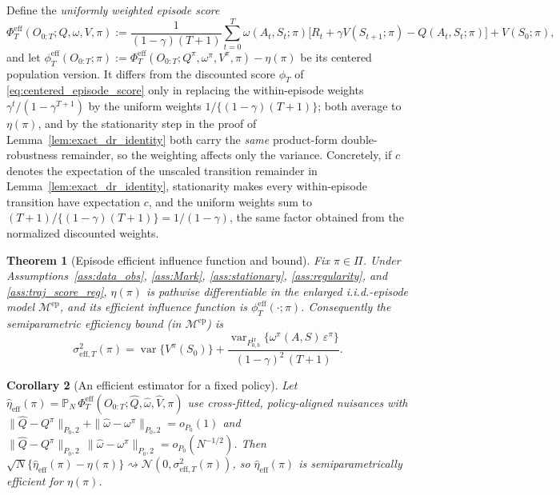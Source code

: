 \documentclass[12pt]{article}
\newtheorem{theorem}{Theorem}[section]
\newtheorem{corollary}[theorem]{Corollary}
\theoremstyle{remark}\newtheorem{remark}[theorem]{Remark}\theoremstyle{plain}
\newcommand{\pn}{\mathbb{P}_N}
\newcommand{\var}{\operatorname{var}}
\begin{document}
Define the \emph{uniformly weighted episode score}
\begin{equation}\label{eq:eff_score}
    \Phi^{\mathrm{eff}}_T(O_{0:T};Q,\omega,V,\pi)
    := \frac{1}{(1-\gamma)(T+1)}\sum_{t=0}^{T}
       \omega(A_t,S_t;\pi)\big[R_t+\gamma V(S_{t+1};\pi)
       -Q(A_t,S_t;\pi)\big]+V(S_0;\pi),
\end{equation}
and let
$\phi^{\mathrm{eff}}_T(O_{0:T};\pi)
:=\Phi^{\mathrm{eff}}_T(O_{0:T};Q^\pi,\omega^\pi,V^\pi,\pi)-\eta(\pi)$
be its centered population version.  It differs from the discounted
score $\phi_T$ of \eqref{eq:centered_episode_score} only in replacing
the within-episode weights $\gamma^t/(1-\gamma^{T+1})$ by the uniform
weights $1/\{(1-\gamma)(T+1)\}$; both average to $\eta(\pi)$, and by the
stationarity step in the proof of Lemma~\ref{lem:exact_dr_identity}
both carry the \emph{same} product-form double-robustness remainder, so
the weighting affects only the variance.  Concretely, if $c$ denotes
the expectation of the unscaled transition remainder in
Lemma~\ref{lem:exact_dr_identity}, stationarity makes every
within-episode transition have expectation $c$, and the uniform weights
sum to $(T+1)/\{(1-\gamma)(T+1)\}=1/(1-\gamma)$, the same factor
obtained from the normalized discounted weights.

\begin{theorem}[Episode efficient influence function and bound]
\label{thm:traj_eif}
    Fix $\pi\in\Pi$.  Under Assumptions~\ref{ass:data_obs},
    \ref{ass:Mark}, \ref{ass:stationary}, \ref{ass:regularity}, and
    \ref{ass:traj_score_reg}, $\eta(\pi)$ is pathwise differentiable in
    the enlarged i.i.d.-episode model $\mathcal M^{\mathrm{ep}}$, and its
    efficient influence function is $\phi^{\mathrm{eff}}_T(\cdot;\pi)$.
    Consequently the semiparametric efficiency bound (in
    $\mathcal M^{\mathrm{ep}}$) is
    \[
        \sigma^2_{\mathrm{eff},T}(\pi)
        =\var\{V^\pi(S_0)\}
        +\frac{\var_{P_{0,b}^{\mathrm{tr}}}
        \{\omega^\pi(A,S)\,\varepsilon^\pi\}}
        {(1-\gamma)^2\,(T+1)}.
    \]
\end{theorem}

\begin{corollary}[An efficient estimator for a fixed policy]
\label{cor:eff_est}
    Let
    $\widehat\eta_{\mathrm{eff}}(\pi)
    =\pn\,\Phi^{\mathrm{eff}}_T
    (O_{0:T};\widehat Q,\widehat\omega,\widehat V,\pi)$
    use cross-fitted, policy-aligned nuisances with
    $\|\widehat Q-Q^\pi\|_{P_0,2}
    +\|\widehat\omega-\omega^\pi\|_{P_0,2}=o_{P_0}(1)$ and
    $\|\widehat Q-Q^\pi\|_{P_0,2}\,
    \|\widehat\omega-\omega^\pi\|_{P_0,2}=o_{P_0}(N^{-1/2})$.  Then
    $\sqrt N\{\widehat\eta_{\mathrm{eff}}(\pi)-\eta(\pi)\}
    \rightsquigarrow\mathcal N(0,\sigma^2_{\mathrm{eff},T}(\pi))$, so
    $\widehat\eta_{\mathrm{eff}}(\pi)$ is semiparametrically efficient
    for $\eta(\pi)$.
\end{corollary}
\end{document}

